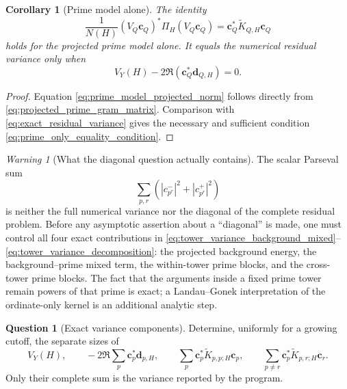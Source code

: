 \documentclass[11pt]{amsart}
\numberwithin{equation}{section}
\theoremstyle{plain}
\newtheorem{corollary}[theorem]{Corollary}
\theoremstyle{definition}
\newtheorem{question}[theorem]{Question}
\theoremstyle{remark}
\newtheorem{warning}[theorem]{Warning}
\newcommand{\1}{\mathbf{1}}
\begin{document}
\begin{corollary}[Prime model alone]
\label{cor:prime_model_variance_only}
The identity
\begin{equation}
\frac1{N(H)}
(V_Q\mathbf c_Q)^\ast\Pi_H(V_Q\mathbf c_Q)
=
\mathbf c_Q^\ast\widetilde K_{Q,H}\mathbf c_Q
\label{eq:prime_model_projected_norm}
\end{equation}
holds for the projected prime model alone.  It equals the numerical
residual variance only when
\begin{equation}
V_Y(H)-2\Re(\mathbf c_Q^\ast\mathbf d_{Q,H})=0.
\label{eq:prime_only_equality_condition}
\end{equation}
\end{corollary}

\begin{proof}
Equation \eqref{eq:prime_model_projected_norm} follows directly from
\eqref{eq:projected_prime_gram_matrix}.  Comparison with
\eqref{eq:exact_residual_variance} gives the necessary and sufficient
condition \eqref{eq:prime_only_equality_condition}.
\end{proof}

\begin{warning}[What the diagonal question actually contains]
\label{warn:diagonal_issue}
The scalar Parseval sum
\begin{equation}
\sum_{p,r}
\left(|c_{p^r}^-|^2+|c_{p^r}^+|^2\right)
\label{eq:ordinary_parseval_diagonal}
\end{equation}
is neither the full numerical variance nor the diagonal of the complete
residual problem.  Before any asymptotic assertion about a ``diagonal'' is
made, one must control all four exact contributions in
\eqref{eq:tower_variance_background_mixed}--
\eqref{eq:tower_variance_decomposition}: the projected background energy,
the background--prime mixed term, the within-tower prime blocks, and the
cross-tower prime blocks.  The fact that the arguments inside a fixed
prime tower remain powers of that prime is exact; a Landau--Gonek
interpretation of the ordinate-only kernel is an additional analytic step.
\end{warning}

\begin{question}[Exact variance components]
\label{question:tower_block_energy}
Determine, uniformly for a growing cutoff, the separate sizes of
\begin{equation}
V_Y(H),
\qquad
-2\Re\sum_p\mathbf c_p^\ast\mathbf d_{p,H},
\qquad
\sum_p\mathbf c_p^\ast\widetilde K_{p,p;H}\mathbf c_p,
\qquad
\sum_{p\neq r}\mathbf c_p^\ast\widetilde K_{p,r;H}\mathbf c_r.
\label{eq:four_variance_components}
\end{equation}
Only their complete sum is the variance reported by the program.
\end{question}
\end{document}
